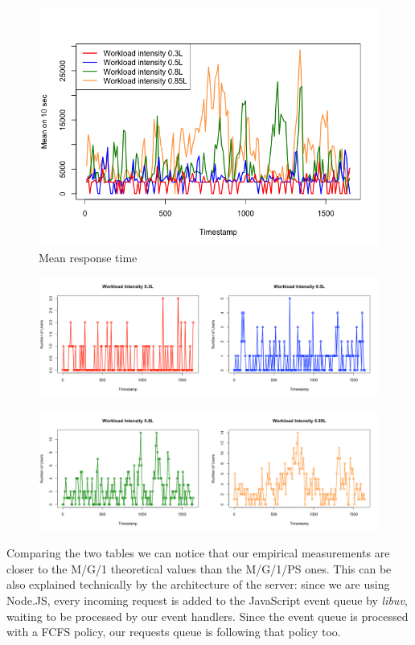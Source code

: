 \documentclass[11pt]{scrartcl} %
\begin{document}
\begin{figure}[H]
\centering
\includegraphics[width=15cm]{Images/respTimes.png}
\caption{Mean response time}
\end{figure}

\begin{figure}[H]
\centering
\includegraphics[width=15cm]{Images/user35side.png}
\end{figure}

\begin{figure}[H]
\centering
\includegraphics[width=15cm]{Images/user858side.png}
\end{figure}


Comparing the two tables we can notice that our empirical measurements are closer to the M/G/1 theoretical values than the M/G/1/PS ones. This can be also explained technically by the architecture of the server: since we are using Node.JS, every incoming request is added to the JavaScript event queue by \textit{libuv}, waiting to be processed by our event handlers. Since the event queue is processed with a FCFS policy, our requests queue is following that policy too.
\end{document}
